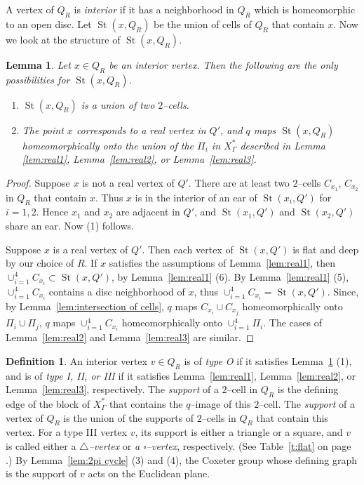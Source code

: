 \documentclass[11pt]{amsart}
\newcommand{\St}{\operatorname{St}}
\newtheorem{lemma}[theorem]{Lemma}
\theoremstyle{definition}
\newtheorem{definition}[theorem]{Definition}
\newcommand{\Xa}{X^{\ast}}
\begin{document}
A vertex of $Q_R$ is \emph{interior} if it has a neighborhood in $Q_R$ which is homeomorphic to an open disc. Let $\St(x,Q_R)$ be the union of cells of $Q_R$ that contain $x$. Now we look at the structure of $\St(x,Q_R)$.

\begin{lemma}
	\label{lem:star homeo}
Let $x\in Q_R$ be an interior vertex. Then the following are the only possibilities for $\St(x,Q_R)$.
\begin{enumerate}
	\item $\St(x,Q_R)$ is a union of two $2$--cells.
	\item The point $x$ corresponds to a real vertex in $Q'$, and $q$ maps $\St(x,Q_R)$ homeomorphically onto the union of the $\Pi_i$ in $\Xa_\Gamma$ described in Lemma \ref{lem:real1}, Lemma~\ref{lem:real2}, or Lemma~\ref{lem:real3}.
\end{enumerate}
\end{lemma}

\begin{proof}
Suppose $x$ is not a real vertex of $Q'$. There are at least two $2$--cells $C_{x_1}$, $C_{x_2}$ in $Q_R$ that contain $x$. Thus $x$ is in the interior of an ear of $\St(x_i,Q')$ for $i=1,2$. Hence $x_1$ and $x_2$ are adjacent in $Q'$, and $\St(x_1,Q')$ and $\St(x_2,Q')$ share an ear. Now (1) follows.

Suppose $x$ is a real vertex of $Q'$. Then each vertex of $\St(x,Q')$ is flat and deep by our choice of $R$. If $x$ satisfies the assumptions of Lemma~\ref{lem:real1}, then $\cup_{i=1}^4 C_{x_i}\subset \St(x,Q')$, by Lemma~\ref{lem:real1} (6). By Lemma~\ref{lem:real1} (5), $\cup_{i=1}^4 C_{x_i}$ contains a disc neighborhood of $x$, thus $\cup_{i=1}^4 C_{x_i}=\St(x,Q')$. Since, by Lemma~\ref{lem:intersection of cells}, $q$ maps $C_{x_i}\cup C_{x_j}$ homeomorphically onto $\Pi_i\cup\Pi_j$, $q$ maps $\cup_{i=1}^4 C_{x_i}$ homeomorphically onto $\cup_{i=1}^4\Pi_i$. The cases of Lemma~\ref{lem:real2} and Lemma~\ref{lem:real3} are similar.
\end{proof}

\begin{definition}
	\label{d:types}
	An interior vertex $v\in Q_R$ is of \emph{type O} if it satisfies Lemma~\ref{lem:star homeo} (1), and is of \emph{type I, II, or III} if it satisfies Lemma~\ref{lem:real1}, Lemma~\ref{lem:real2}, or Lemma~\ref{lem:real3}, respectively. The \emph{support} of a $2$--cell in $Q_R$ is the defining edge of the block of $\Xa_\Gamma$ that contains the $q$--image of this $2$--cell. The \emph{support} of a vertex of $Q_R$ is the union of the supports of $2$--cells in $Q_R$ that contain this vertex. For a type III vertex $v$, its support is either a triangle or a square, and $v$ is called either a \emph{$\triangle$--vertex} or \emph{a $\square$--vertex}, respectively. (See Table~\ref{t:flat} on page \pageref{t:flat}.) By Lemma~\ref{lem:2pi cycle} (3) and (4), the Coxeter group whose defining graph is the support of $v$ acts on the Euclidean plane. 
\end{definition}
\end{document}
